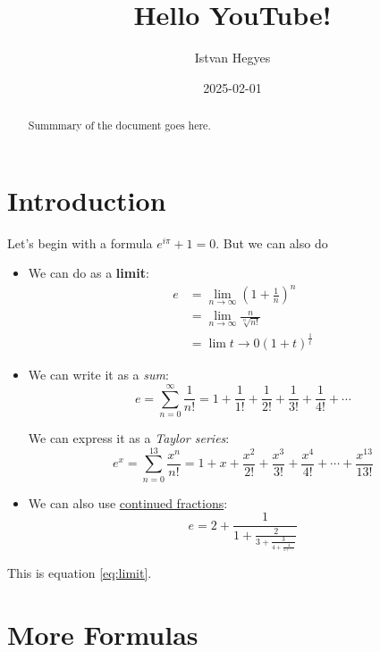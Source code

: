 \documentclass{article}
\title{Hello YouTube!}
\author{Istvan Hegyes}
\date{2025-02-01}
\begin{document}
\maketitle

\tableofcontents
\listoffigures

\begin{abstract}
    Summmary of the document goes here.
\end{abstract}

\section{Introduction}
Let's begin with a formula $e^{i\pi}+1=0$. But we can also do

\begin{itemize}
    \item
          We can do as a \textbf{limit}:
          \begin{equation}
              \begin{aligned}
                  e & = \lim_{n \to \infty} \left(1+\frac{1}{n}\right)^n \\
                    & = \lim_{n \to \infty} \frac{n}{\sqrt[n]{n!}}       \\
                    & = \lim{t \to 0} \left(1 + t\right)^{\frac{1}{t}}
              \end{aligned}
              \label{eq:limit}
          \end{equation}
    \item
          We can write it as a \textit{sum}:
          \[
              e=\sum_{n=0}^{\infty} \frac{1}{n!} = 1 + \frac{1}{1!} + \frac{1}{2!} + \frac{1}{3!} + \frac{1}{4!} + \cdots
          \]

          We can express it as a \textit{Taylor series}:
          \begin{equation}
              e^x = \sum_{n=0}^{13} \frac{x^n}{n!} = 1 + x + \frac{x^2}{2!} + \frac{x^3}{3!} + \frac{x^4}{4!} + \cdots + \frac{x^{13}}{13!}
              \label{eq:taylor}
          \end{equation}
    \item
          We can also use \underline{continued fractions}:
          \[
              e=2+\frac{1}{1+\frac{2}{3+\frac{3}{4+\frac{4}{5+\ddots}}}}
          \]
\end{itemize}

This is equation \eqref{eq:limit}.

\section{More Formulas}
\end{document}
